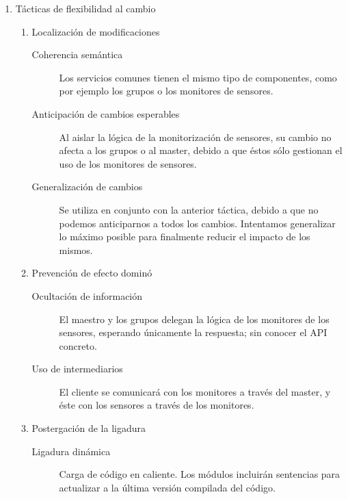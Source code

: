 \documentclass[a4paper,10pt]{article}
\begin{document}
\begin{enumerate}
  \item Tácticas de flexibilidad al cambio
  \begin{enumerate}
    \item Localización de modificaciones
    \begin{description}
      \item [Coherencia semántica] Los servicios comunes tienen el mismo tipo de 
componentes, como por ejemplo los grupos o los monitores de sensores.
      \item [Anticipación de cambios esperables] Al aislar la lógica de la 
monitorización de sensores, su cambio no afecta a los grupos o al master, debido 
a que éstos sólo gestionan el uso de los monitores de sensores.
      \item [Generalización de cambios] Se utiliza en conjunto con la anterior 
táctica, debido a que no podemos anticiparnos a todos los cambios. Intentamos 
generalizar lo máximo posible para finalmente reducir el impacto de los mismos.
    \end{description}
    \item Prevención de efecto dominó
    \begin{description}
      \item [Ocultación de información] El maestro y los grupos delegan la 
lógica de los monitores de los sensores, esperando únicamente la respuesta; sin 
conocer el API concreto.
      \item [Uso de intermediarios] El cliente se comunicará con los monitores a 
través del master, y éste con los sensores a través de los monitores.
    \end{description}
    \item Postergación de la ligadura
    \begin{description}
      \item [Ligadura dinámica] Carga de código en caliente. Los módulos 
incluirán sentencias para actualizar a la última versión compilada del código.
    \end{description}
  \end{enumerate}
  

\end{enumerate}
\end{document}
